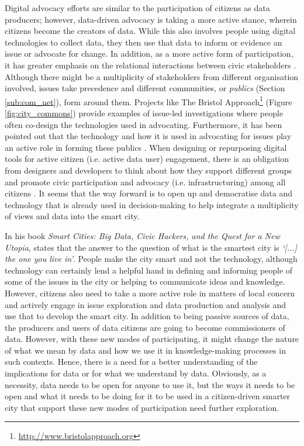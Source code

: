 Digital advocacy efforts are similar to the participation of citizens as data producers; however, data-driven advocacy \citep{gray_changing_2016,asad_tap_2017} is taking a more active stance, wherein citizens become the creators of data. While this also involves people using digital technologies to collect data, they then use that data to inform or evidence an issue or advocate for change. In addition, as a more active form of participation, it has greater emphasis on the relational interactions between civic stakeholders \citep{olivier_digital_2015,vlachokyriakos_digital_2016,asad_tap_2017}. Although there might be a multiplicity of stakeholders from different organisation involved, issues take precedence and different communities, or \textit{publics} (Section \ref{sub:com_net}), form around them. Projects like The Bristol Approach\footnote{\url{http://www.bristolapproach.org}} (Figure \ref{fig:city_commons}) provide examples of issue-led investigations where people often co-design the technologies used in advocating. Furthermore, it has been pointed out that the technology and how it is used in advocating for issues play an active role in forming these publics \citep{dantec_infrastructuring_2013,jenkins_object-oriented_2016}. When designing or repurposing digital tools for active citizen (i.e. active data user) engagement, there is an obligation from designers and developers to think about how they support different groups and promote civic participation and advocacy (i.e. infrastructuring) among all citizens \citep{asad_tap_2017}. It seems that the way forward is to open up and democratise data and technology that is already used in decision-making to help integrate a multiplicity of views and data into the smart city.
\newline

\noindent
In his book \textit{Smart Cities: Big Data, Civic Hackers, and the Quest for a New Utopia}, \citet{townsend_smart_2013} states that the answer to the question of what is the smartest city is \textit{`[...] the one you live in'}. People make the city smart and not the technology, although technology can certainly lend a helpful hand in defining and informing people of some of the issues in the city or helping to communicate ideas and knowledge. However, citizens also need to take a more active role in matters of local concern and actively engage in issue exploration and data production and analysis and use that to develop the smart city. In addition to being passive sources of data, the producers and users of data citizens are going to become commissioners of data. However, with these new modes of participating, it might change the nature of what we mean by data and how we use it in knowledge-making processes in such contexts. Hence, there is a need for a better understanding of the implications for data or for what we understand by data. Obviously, as a necessity, data needs to be open for anyone to use it, but the ways it needs to be open and what it needs to be doing for it to be used in a citizen-driven smarter city that support these new modes of participation need further exploration.


